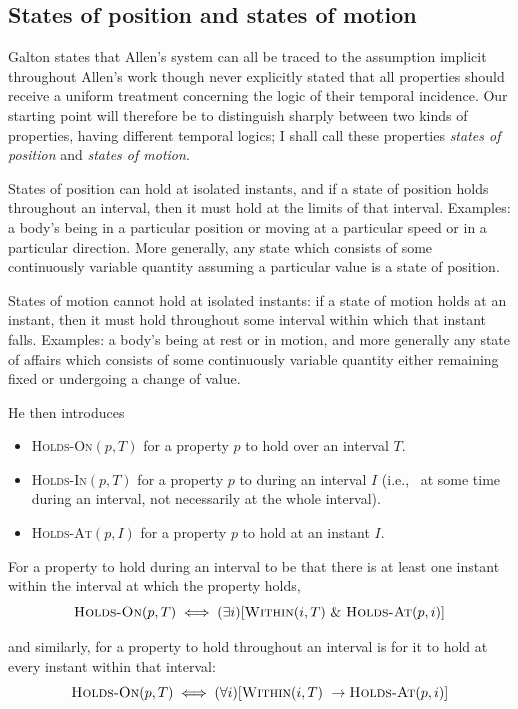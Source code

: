 \subsection{States of position and states of motion}
Galton states that Allen's system can all be traced to the assumption implicit throughout Allen's
work though never explicitly stated that all properties should receive a
uniform treatment concerning the logic of their temporal incidence. Our
starting point will therefore be to distinguish sharply between two kinds of
properties, having different temporal logics; I shall call these properties \textit{states
	of position} and \textit{states of motion}.

States of position can hold at isolated instants, and if a state of position
holds throughout an interval, then it must hold at the limits of that interval.
Examples: a body's being in a particular position or moving at a particular
speed or in a particular direction. More generally, any state which consists of
some continuously variable quantity assuming a particular value is a state of
position.

States of motion cannot hold at isolated instants: if a state of motion holds
at an instant, then it must hold throughout some interval within which that
instant falls. Examples: a body's being at rest or in motion, and more generally
any state of affairs which consists of some continuously variable quantity
either remaining fixed or undergoing a change of value.

He then introduces
\begin{itemize}
	\item  \textsc{Holds-On}$(p, T)$ for a property $p$ to hold over an interval $T$.
	\item \textsc{Holds-In}$(p, T)$ for a property $p$ to during an interval $I$ (i.e., \ at some time during an interval, not necessarily at the whole interval).
	\item \textsc{Holds-At}$(p, I)$ for a property $p$ to hold at an instant $I$.
\end{itemize}

For a property to hold during
an interval to be that there is at least one instant within the interval at which
the property holds,
\[
	\textsc{Holds-On}(p, T) \iff (\exists i)[\textsc{Within}(i, T) \  \& \ \textsc{Holds-At}(p, i)]
\]

and similarly, for a property to hold throughout an interval is for it to hold at
every instant within that interval:
\[
	\textsc{Holds-On}(p, T) \iff (\forall i)[\textsc{Within}(i, T) \  \to \textsc{Holds-At}(p, i)]
\]


